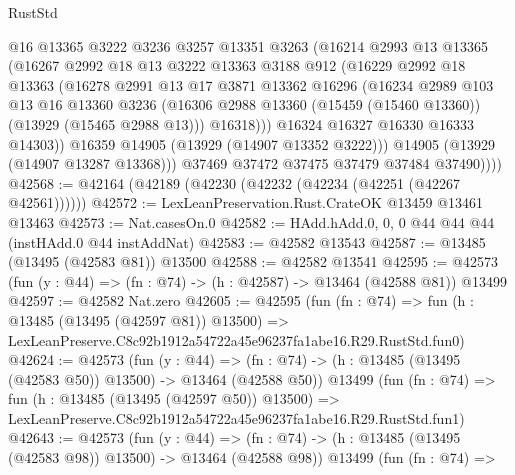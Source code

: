 \begin{lexlean}{RustStd}
\begin{coremodule}
                @16
                @13365
                @3222
                @3236
                @3257
                @13351
                @3263
                (@16214
                  @2993
                  @13
                  @13365
                  (@16267
                    @2992
                    @18
                    @13
                    @3222
                    @13363
                    @3188
                    @912
                    (@16229
                      @2992
                      @18
                      @13363
                      (@16278
                        @2991
                        @13
                        @17
                        @3871
                        @13362
                        @16296
                        (@16234
                          @2989
                          @103
                          @13
                          @16
                          @13360
                          @3236
                          (@16306 @2988 @13360 (@15459 (@15460 @13360)) (@13929 (@15465 @2988 @13)))
                          @16318)))
                    @16324
                    @16327
                    @16330
                    @16333
                    @14303))
                @16359
                @14905
                (@13929 (@14907 @13352 @3222)))
              @14905
              (@13929 (@14907 @13287 @13368)))
            @37469
            @37472
            @37475
            @37479
            @37484
            @37490))))
@42568 := @42164 (@42189 (@42230 (@42232 (@42234 (@42251 (@42267 @42561))))))
@42572 := LexLeanPreservation.Rust.CrateOK @13459 @13461 @13463
@42573 := Nat.casesOn.{0}
@42582 := HAdd.hAdd.{0, 0, 0} @44 @44 @44 (instHAdd.{0} @44 instAddNat)
@42583 := @42582 @13543
@42587 := @13485 (@13495 (@42583 @81)) @13500
@42588 := @42582 @13541
@42595 := @42573 (fun (y : @44) => (fn : @74) -> (h : @42587) -> @13464 (@42588 @81)) @13499
@42597 := @42582 Nat.zero
@42605 := @42595
    (fun (fn : @74) =>
    fun (h : @13485 (@13495 (@42597 @81)) @13500) =>
    LexLeanPreserve.C8c92b1912a54722a45e96237fa1abe16.R29.RustStd.fun0)
@42624 := @42573
    (fun (y : @44) =>
    (fn : @74) -> (h : @13485 (@13495 (@42583 @50)) @13500) -> @13464 (@42588 @50))
    @13499
    (fun (fn : @74) =>
    fun (h : @13485 (@13495 (@42597 @50)) @13500) =>
    LexLeanPreserve.C8c92b1912a54722a45e96237fa1abe16.R29.RustStd.fun1)
@42643 := @42573
    (fun (y : @44) =>
    (fn : @74) -> (h : @13485 (@13495 (@42583 @98)) @13500) -> @13464 (@42588 @98))
    @13499
    (fun (fn : @74) =>

\end{coremodule}
\end{lexlean}
